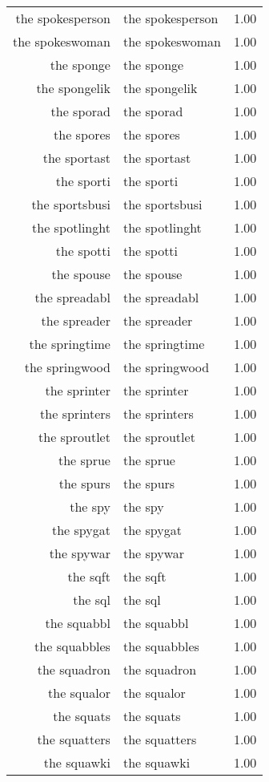 \begin{table}[ht]
\begin{tabular}{rlr}
  the spokesperson & the spokesperson & 1.00 \\ 
  the spokeswoman & the spokeswoman & 1.00 \\ 
  the sponge & the sponge & 1.00 \\ 
  the spongelik & the spongelik & 1.00 \\ 
  the sporad & the sporad & 1.00 \\ 
  the spores & the spores & 1.00 \\ 
  the sportast & the sportast & 1.00 \\ 
  the sporti & the sporti & 1.00 \\ 
  the sportsbusi & the sportsbusi & 1.00 \\ 
  the spotlinght & the spotlinght & 1.00 \\ 
  the spotti & the spotti & 1.00 \\ 
  the spouse & the spouse & 1.00 \\ 
  the spreadabl & the spreadabl & 1.00 \\ 
  the spreader & the spreader & 1.00 \\ 
  the springtime & the springtime & 1.00 \\ 
  the springwood & the springwood & 1.00 \\ 
  the sprinter & the sprinter & 1.00 \\ 
  the sprinters & the sprinters & 1.00 \\ 
  the sproutlet & the sproutlet & 1.00 \\ 
  the sprue & the sprue & 1.00 \\ 
  the spurs & the spurs & 1.00 \\ 
  the spy & the spy & 1.00 \\ 
  the spygat & the spygat & 1.00 \\ 
  the spywar & the spywar & 1.00 \\ 
  the sqft & the sqft & 1.00 \\ 
  the sql & the sql & 1.00 \\ 
  the squabbl & the squabbl & 1.00 \\ 
  the squabbles & the squabbles & 1.00 \\ 
  the squadron & the squadron & 1.00 \\ 
  the squalor & the squalor & 1.00 \\ 
  the squats & the squats & 1.00 \\ 
  the squatters & the squatters & 1.00 \\ 
  the squawki & the squawki & 1.00 \\ 

\end{tabular}
\end{table}
